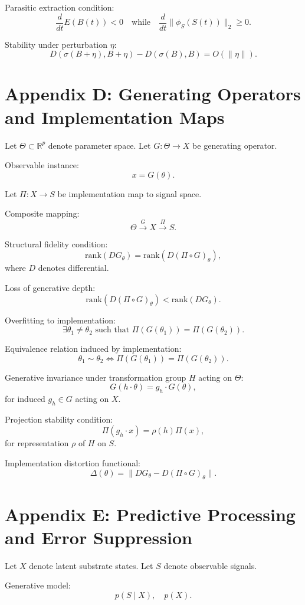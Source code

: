 \documentclass[11pt]{article}
\begin{document}
Parasitic extraction condition:
\[
\frac{d}{dt}E(B(t)) < 0
\quad \text{while} \quad
\frac{d}{dt}\|\phi_S(S(t))\|_2 \ge 0.
\]

Stability under perturbation $\eta$:
\[
D(\sigma(B+\eta),B+\eta) - D(\sigma(B),B) = O(\|\eta\|).
\]

\section{Appendix D: Generating Operators and Implementation Maps}

Let $\Theta \subset \mathbb{R}^p$ denote parameter space.  
Let $G : \Theta \to X$ be generating operator.

Observable instance:
\[
x = G(\theta).
\]

Let $\Pi : X \to S$ be implementation map to signal space.

Composite mapping:
\[
\Theta \xrightarrow{G} X \xrightarrow{\Pi} S.
\]

Structural fidelity condition:
\[
\mathrm{rank}(DG_\theta) = \mathrm{rank}(D(\Pi \circ G)_\theta),
\]
where $D$ denotes differential.

Loss of generative depth:
\[
\mathrm{rank}(D(\Pi \circ G)_\theta) < \mathrm{rank}(DG_\theta).
\]

Overfitting to implementation:
\[
\exists \theta_1 \ne \theta_2 \text{ such that }
\Pi(G(\theta_1)) = \Pi(G(\theta_2)).
\]

Equivalence relation induced by implementation:
\[
\theta_1 \sim \theta_2
\iff
\Pi(G(\theta_1)) = \Pi(G(\theta_2)).
\]

Generative invariance under transformation group $H$ acting on $\Theta$:
\[
G(h \cdot \theta) = g_h \cdot G(\theta),
\]
for induced $g_h \in G$ acting on $X$.

Projection stability condition:
\[
\Pi(g_h \cdot x) = \rho(h)\Pi(x),
\]
for representation $\rho$ of $H$ on $S$.

Implementation distortion functional:
\[
\Delta(\theta)
=
\| DG_\theta - D(\Pi \circ G)_\theta \|.
\]

\section{Appendix E: Predictive Processing and Error Suppression}

Let $X$ denote latent substrate states.  
Let $S$ denote observable signals.  

Generative model:
\[
p(S \mid X), \quad p(X).
\]
\end{document}
